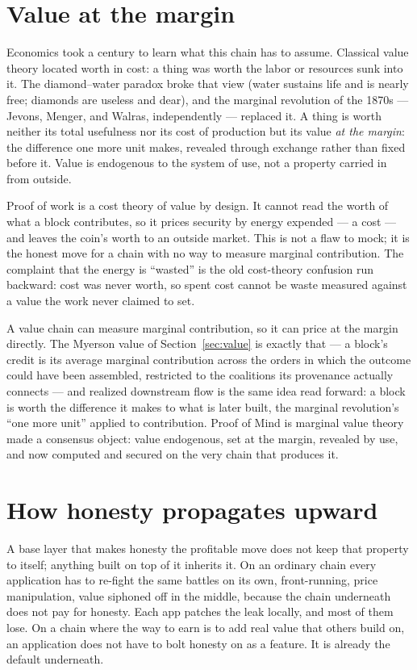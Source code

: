 \documentclass[10pt]{article}
\begin{document}
\section{Value at the margin}

Economics took a century to learn what this chain has to assume. Classical value theory located worth in
cost: a thing was worth the labor or resources sunk into it. The diamond--water paradox broke that view
(water sustains life and is nearly free; diamonds are useless and dear), and the marginal revolution of
the 1870s --- Jevons, Menger, and Walras, independently --- replaced it. A thing is worth neither its
total usefulness nor its cost of production but its value \emph{at the margin}: the difference one more
unit makes, revealed through exchange rather than fixed before it. Value is endogenous to the system of
use, not a property carried in from outside.

Proof of work is a cost theory of value by design. It cannot read the worth of what a block contributes,
so it prices security by energy expended --- a cost --- and leaves the coin's worth to an outside market.
This is not a flaw to mock; it is the honest move for a chain with no way to measure marginal
contribution. The complaint that the energy is ``wasted'' is the old cost-theory confusion run backward:
cost was never worth, so spent cost cannot be waste measured against a value the work never claimed to set.

A value chain can measure marginal contribution, so it can price at the margin directly. The Myerson
value of Section~\ref{sec:value} is exactly that --- a block's credit is its average marginal
contribution across the orders in which the outcome could have been assembled, restricted to the
coalitions its provenance actually connects --- and realized downstream flow is the same idea read
forward: a block is worth the difference it makes to what is later built, the marginal revolution's
``one more unit'' applied to contribution. Proof of Mind is marginal value theory made a consensus
object: value endogenous, set at the margin, revealed by use, and now computed and secured on the very
chain that produces it.

\section{How honesty propagates upward}

A base layer that makes honesty the profitable move does not keep that property to itself; anything
built on top of it inherits it. On an ordinary chain every application has to re-fight the same battles
on its own, front-running, price manipulation, value siphoned off in the middle, because the chain
underneath does not pay for honesty. Each app patches the leak locally, and most of them lose. On a
chain where the way to earn is to add real value that others build on, an application does not have to
bolt honesty on as a feature. It is already the default underneath.
\end{document}
